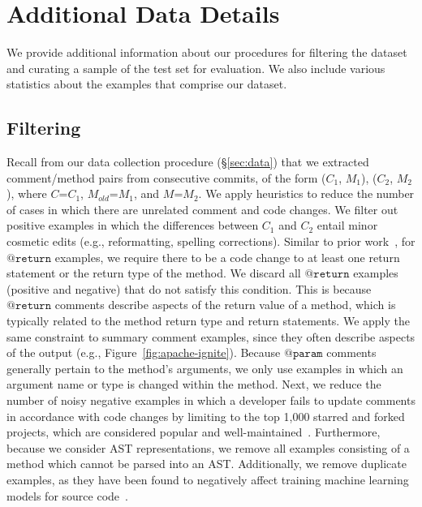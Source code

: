 \documentclass[letterpaper]{article} %
\makeatletter
\newcommand{\CommentA}{$C_{1}$}
\newcommand{\CommentB}{$C_{2}$}
\newcommand{\CodeA}{$M_{1}$}
\newcommand{\CodeB}{$M_{2}$}
\newcommand{\CodeIn}[1]{{\ifmmode{\mathtt{#1}}\else$\mathtt{#1}$\fi}}
\newcommand{\Return}{\CodeIn{@return}}
\newcommand{\Param}{\CodeIn{@param}}
\newcommand{\Comment}{$C$}
\newcommand{\OldCode}{$M_{old}$}
\newcommand{\NewCode}{$M$}
\makeatother
\begin{document}
\begin{small}

\end{small}
\clearpage
\newpage
\appendix

\section{Additional Data Details}
\label{appendix:data}
We provide additional information about our procedures for filtering the dataset and curating a sample of the test set for evaluation. We also include various statistics about the examples that comprise our dataset.

\subsection{Filtering}
Recall from our data collection procedure (\S\ref{sec:data}) that we extracted comment/method pairs from consecutive commits, of the form (\CommentA{}, \CodeA{}), (\CommentB{}, \CodeB{}), where \Comment{}=\CommentA{}, \OldCode{}=\CodeA{}, and \NewCode{}=\CodeB{}. We apply heuristics to reduce the number of cases in which there are unrelated comment and code changes. We filter out positive examples in which the differences between \CommentA{} and \CommentB{} entail minor cosmetic edits (e.g., reformatting, spelling corrections). Similar to prior work~\cite{panthaplackel2020update}, for \Return{} examples, we require there to be a code change to at least one return statement or the return type of the method. We discard all \Return{} examples (positive and negative) that do not satisfy this condition. This is because \Return{} comments describe aspects of the return value of a method, which is typically related to the method return type and return statements. We apply the same constraint to
summary comment examples, since they often describe aspects of the output (e.g., Figure~\ref{fig:apache-ignite}). Because \Param{} comments generally pertain to the method's arguments, we only use examples in which an argument name or type is changed within the method. Next, we reduce the number of noisy negative examples in which a developer fails to update comments in accordance with code changes by limiting to the top 1,000 starred and forked projects, which are considered popular and well-maintained~\cite{ProjectQuality}. Furthermore, because we consider AST representations, we remove all examples consisting of a method which cannot be parsed into an AST. Additionally, we remove duplicate examples, as they have been found to negatively affect training machine learning models for source code~\cite{allamanis2019duplication}.
\end{document}
